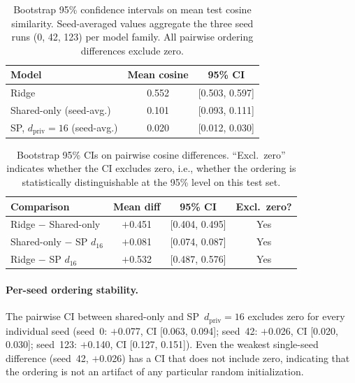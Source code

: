 \documentclass{article}
\begin{document}
\begin{table}[h]
  \centering
  \footnotesize
  \caption{Bootstrap 95\% confidence intervals on mean test cosine similarity.
  Seed-averaged values aggregate the three seed runs (0, 42, 123) per model
  family.  All pairwise ordering differences exclude zero.}
  \label{tab:bootstrap}
  \begin{tabular}{@{}lcc@{}}
    \toprule
    Model & Mean cosine & 95\% CI \\
    \midrule
    Ridge & 0.552 & [0.503, 0.597] \\
    Shared-only (seed-avg.) & 0.101 & [0.093, 0.111] \\
    SP, $d_\mathrm{priv}\!=\!16$ (seed-avg.) & 0.020 & [0.012, 0.030] \\
    \bottomrule
  \end{tabular}
\end{table}

\begin{table}[h]
  \centering
  \footnotesize
  \caption{Bootstrap 95\% CIs on pairwise cosine differences.  ``Excl.\ zero''
  indicates whether the CI excludes zero, i.e., whether the ordering is
  statistically distinguishable at the 95\% level on this test set.}
  \label{tab:ordering}
  \begin{tabular}{@{}lccc@{}}
    \toprule
    Comparison & Mean diff & 95\% CI & Excl.\ zero? \\
    \midrule
    Ridge $-$ Shared-only & $+$0.451 & [0.404, 0.495] & Yes \\
    Shared-only $-$ SP $d_{16}$ & $+$0.081 & [0.074, 0.087] & Yes \\
    Ridge $-$ SP $d_{16}$ & $+$0.532 & [0.487, 0.576] & Yes \\
    \bottomrule
  \end{tabular}
\end{table}

\paragraph{Per-seed ordering stability.}
The pairwise CI between shared-only and SP~$d_\mathrm{priv}\!=\!16$ excludes
zero for every individual seed (seed~0: $+$0.077, CI [0.063, 0.094]; seed~42:
$+$0.026, CI [0.020, 0.030]; seed~123: $+$0.140, CI [0.127, 0.151]).  Even the
weakest single-seed difference (seed~42, $+$0.026) has a CI that does not
include zero, indicating that the ordering is not an artifact of any particular
random initialization.
\end{document}
